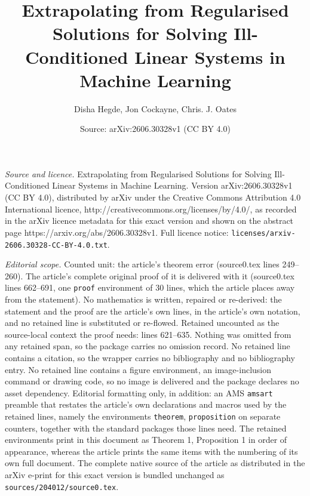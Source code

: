 \documentclass[10pt,a4paper]{amsart}
\title{Extrapolating from Regularised Solutions for Solving Ill-Conditioned Linear Systems in Machine Learning}
\author{Disha Hegde, Jon Cockayne, Chris. J. Oates}
\date{Source: arXiv:2606.30328v1 (CC BY 4.0)}
\begin{document}
\maketitle

\noindent\emph{Source and licence.} Extrapolating from Regularised Solutions for Solving Ill-Conditioned Linear Systems in Machine Learning. Version arXiv:2606.30328v1 (CC BY 4.0), distributed by arXiv under the Creative Commons Attribution 4.0 International licence, http://creativecommons.org/licenses/by/4.0/, as recorded in the arXiv licence metadata for this exact version and shown on the abstract page https://arxiv.org/abs/2606.30328v1. Full licence notice: \texttt{licenses/arxiv-2606.30328-CC-BY-4.0.txt}.\par\smallskip

\noindent\textit{Editorial scope.} Counted unit: the article's theorem error (source0.tex lines 249--260). The article's complete original proof of it is delivered with it (source0.tex lines 662--691, one \texttt{proof} environment of 30 lines, which the article places away from the statement). No mathematics is written, repaired or re-derived: the statement and the proof are the article's own lines, in the article's own notation, and no retained line is substituted or re-flowed.  Retained uncounted as the source-local context the proof needs: lines 621--635.  Nothing was omitted from any retained span, so the package carries no omission record.  No retained line contains a citation, so the wrapper carries no bibliography and no bibliography entry.  No retained line contains a figure environment, an image-inclusion command or drawing code, so no image is delivered and the package declares no asset dependency.  Editorial formatting only, in addition: an AMS \texttt{amsart} preamble that restates the article's own declarations and macros used by the retained lines, namely the environments \texttt{theorem}, \texttt{proposition} on separate counters, together with the standard packages those lines need.  The retained environments print in this document as Theorem 1, Proposition 1 in order of appearance, whereas the article prints the same items with the numbering of its own full document.  The complete native source of the article as distributed in the arXiv e-print for this exact version is bundled unchanged as \texttt{sources/204012/source0.tex}.
\end{document}
